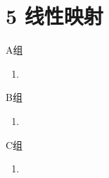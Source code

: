 \section*{5 线性映射}

\vspace{2ex}

\centerline{\heiti A组}
\begin{enumerate}
    \item
\end{enumerate}

\centerline{\heiti B组}
\begin{enumerate}
    \item
\end{enumerate}

\centerline{\heiti C组}
\begin{enumerate}
    \item
\end{enumerate}

\clearpage
